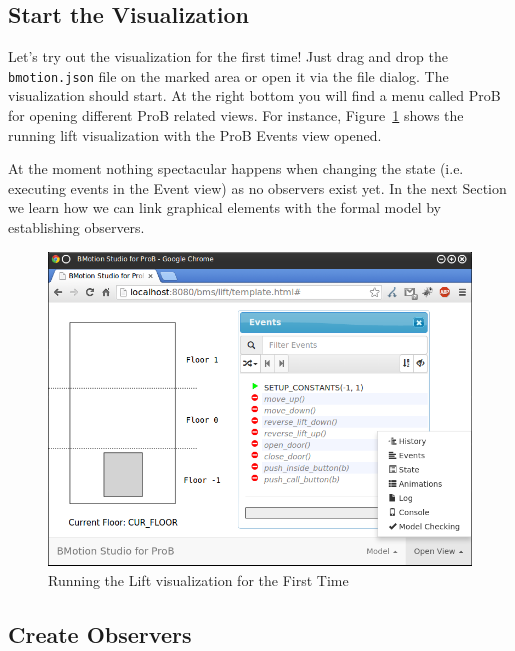 \subsection{Start the Visualization}
\label{sec:stat_vis}

Let's try out the visualization for the first time!
Just drag and drop the \texttt{bmotion.json} file on the marked area or open it via the file dialog.
The visualization should start.
At the right bottom you will find a menu called \textsf{ProB} for opening different ProB related views.
For instance, Figure~\ref{fig_tut_03_running1} shows the running lift visualization with the ProB Events view opened.

At the moment nothing spectacular happens when changing the state (i.e. executing events in the Event view) as no observers exist yet.
In the next Section we learn how we can link graphical elements with the formal model by establishing observers.

\begin{figure}[!ht]
\begin{center}
	\includegraphics[width=12cm]{img/tutorial/tut_03.png}
	\caption{Running the Lift visualization for the First Time}
	\label{fig_tut_03_running1}
\end{center}
\end{figure}

\subsection{Create Observers}
\label{sec_creation_observers}


